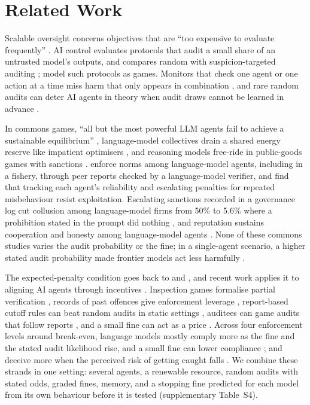 \documentclass[letterpaper]{article} %
\begin{document}
\section{Related Work}
\label{sec:related}

Scalable oversight concerns objectives that are ``too expensive to evaluate frequently'' \citep{amodei2016concrete,bowman2022measuring}. AI control evaluates protocols that audit a small share of an untrusted model's outputs, and compares random with suspicion-targeted auditing \citep{greenblatt2024control}; \citet{griffin2024games} model such protocols as games. Monitors that check one agent or one action at a time miss harm that only appears in combination \citep{makins2026multiagent,hu2026local}, and rare random audits can deter AI agents in theory when audit draws cannot be learned in advance \citep{gans2026randomized}.

In commons games, ``all but the most powerful LLM agents fail to achieve a sustainable equilibrium'' \citep{piatti2024cooperate}, language-model collectives drain a shared energy reserve like impatient optimisers \citep{bracale2026draining}, and reasoning models free-ride in public-goods games with sanctions \citep{guzman2025corrupted}. \citet{ye2026norm} enforce norms among language-model agents, including in a fishery, through peer reports checked by a language-model verifier, and find that tracking each agent's reliability and escalating penalties for repeated misbehaviour resist exploitation. Escalating sanctions recorded in a governance log cut collusion among language-model firms from 50\% to 5.6\% where a prohibition stated in the prompt did nothing \citep{bracale2026institutional}, and reputation sustains cooperation and honesty among language-model agents \citep{ren2026repunet,yang2026carp}. None of these commons studies varies the audit probability or the fine; in a single-agent scenario, a higher stated audit probability made frontier models act less harmfully \citep{konuganti2026deterrence}.

The expected-penalty condition goes back to \citet{becker1968crime} and \citet{allingham1972income}, and recent work applies it to aligning AI agents through incentives \citep{agarwal2026incentives}. Inspection games formalise partial verification \citep{avenhaus2002inspection}, records of past offences give enforcement leverage \citep{harrington1988enforcement}, report-based cutoff rules can beat random audits in static settings \citep{reinganum1985income}, auditees can game audits that follow reports \citep{burnat2026auditee}, and a small fine can act as a price \citep{gneezy2000fine}. Across four enforcement levels around break-even, language models mostly comply more as the fine and the stated audit likelihood rise, and a small fine can lower compliance \citep{okamoto2026why}; and deceive more when the perceived risk of getting caught falls \citep{scheurer2023strategic}. We combine these strands in one setting: several agents, a renewable resource, random audits with stated odds, graded fines, memory, and a stopping fine predicted for each model from its own behaviour before it is tested (supplementary Table~S4).
\end{document}
